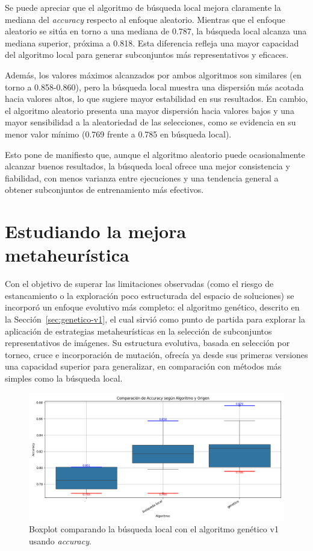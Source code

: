 Se puede apreciar que el algoritmo de búsqueda local mejora claramente la mediana del \textit{accuracy} respecto al enfoque aleatorio.
Mientras que el enfoque aleatorio se sitúa en torno a una mediana de 0.787, la búsqueda local alcanza una mediana superior, próxima a 0.818.
Esta diferencia refleja una mayor capacidad del algoritmo local para generar subconjuntos más representativos y eficaces.

Además, los valores máximos alcanzados por ambos algoritmos son similares (en torno a 0.858-0.860),
pero la búsqueda local muestra una dispersión más acotada hacia valores altos, lo que sugiere mayor estabilidad en sus resultados.
En cambio, el algoritmo aleatorio presenta una mayor dispersión hacia valores bajos y una mayor sensibilidad a la aleatoriedad de las selecciones,
como se evidencia en su menor valor mínimo (0.769 frente a 0.785 en búsqueda local).

Esto pone de manifiesto que, aunque el algoritmo aleatorio puede ocasionalmente alcanzar buenos resultados,
la búsqueda local ofrece una mejor consistencia y fiabilidad, con menos varianza entre ejecuciones y una tendencia general a obtener subconjuntos de entrenamiento más efectivos.


\section{Estudiando la mejora metaheurística}\label{sec:estudio-mejora-metaheuristica}
Con el objetivo de superar las limitaciones observadas (como el riesgo de estancamiento o la exploración poco estructurada del espacio de soluciones)
se incorporó un enfoque evolutivo más completo: el algoritmo genético, descrito en la Sección~\ref{sec:genetico-v1}, el cual sirvió como punto de partida para explorar la
aplicación de estrategias metaheurísticas en la selección de subconjuntos representativos de imágenes.
Su estructura evolutiva, basada en selección por torneo, cruce e incorporación de mutación,
ofrecía ya desde sus primeras versiones una capacidad superior para generalizar, en comparación con métodos más simples como la búsqueda local.

\begin{figure}[H]
    \centering
    \includegraphics[width=1\textwidth]{imagenes/evaluaciones/comparacion_bl-gen_v1}
    \caption{Boxplot comparando la búsqueda local con el algoritmo genético v1 usando \textit{accuracy}.}
    \label{fig:bl-vs-gen-v1}
\end{figure}

